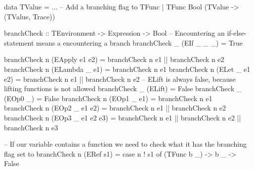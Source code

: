         \begin{haskell}[caption=Checking for branches, label=lst:branching, gobble=12]
            data TValue
                = $\ldots$
                -- Add a branching flag to TFunc
                | TFunc Bool (TValue -> (TValue, Trace))

            branchCheck :: TEnvironment -> Expression -> Bool
            -- Encountering an if-else-statement means a encountering a branch
            branchCheck _ (EIf _ _ _) = True

            branchCheck n (EApply e1 e2) = branchCheck n e1 || branchCheck n e2
            branchCheck n (ELambda _ e1) = branchCheck n e1
            branchCheck n (ELet _ e1 e2) = branchCheck n e1 || branchCheck n e2
            -- ELift is always false, because lifting functions is not allowed
            branchCheck _ (ELift) = False
            branchCheck _ (EOp0 _) = False
            branchCheck n (EOp1 _ e1) = branchCheck n e1
            branchCheck n (EOp2 _ e1 e2) = branchCheck n e1 || branchCheck n e2
            branchCheck n (EOp3 _ e1 e2 e3) =
                branchCheck n e1 || branchCheck n e2 || branchCheck n e3
            
            -- If our variable contains a function we need to check what it has the branching flag set to
            branchCheck n (ERef s1) = case n ! s1 of
                (TFunc b _) -> b
                _           -> False
        \end{haskell}

